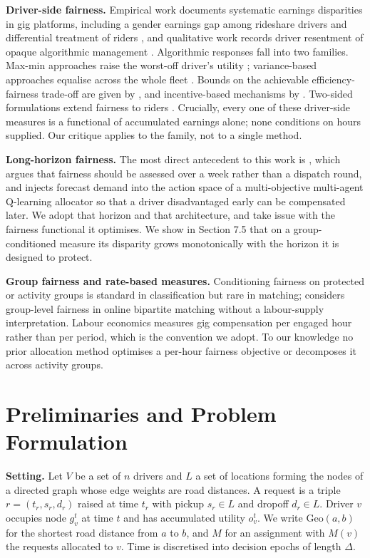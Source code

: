 \documentclass[10pt,twocolumn]{article}
\begin{document}
\textbf{Driver-side fairness.} Empirical work documents systematic earnings disparities in gig platforms, including a gender earnings gap among rideshare drivers \cite{cook2021} and differential treatment of riders \cite{brown2018}, and qualitative work records driver resentment of opaque algorithmic management \cite{mohlmann2019}. Algorithmic responses fall into two families. Max-min approaches raise the worst-off driver's utility \cite{lesmana2019}; variance-based approaches equalise across the whole fleet \cite{raman2021,shi2021,kang2024}. Bounds on the achievable efficiency-fairness trade-off are given by \cite{nanda2020,ma2020}, and incentive-based mechanisms by \cite{kumar2023}. Two-sided formulations extend fairness to riders \cite{suhr2019,kang2024b}. Crucially, every one of these driver-side measures is a functional of accumulated earnings alone; none conditions on hours supplied. Our critique applies to the family, not to a single method.

\textbf{Long-horizon fairness.} The most direct antecedent to this work is \cite{kang2024}, which argues that fairness should be assessed over a week rather than a dispatch round, and injects forecast demand into the action space of a multi-objective multi-agent Q-learning allocator so that a driver disadvantaged early can be compensated later. We adopt that horizon and that architecture, and take issue with the fairness functional it optimises. We show in Section 7.5 that on a group-conditioned measure its disparity grows monotonically with the horizon it is designed to protect.

\textbf{Group fairness and rate-based measures.} Conditioning fairness on protected or activity groups is standard in classification but rare in matching; \cite{ma2020} considers group-level fairness in online bipartite matching without a labour-supply interpretation. Labour economics measures gig compensation per engaged hour rather than per period, which is the convention we adopt. To our knowledge no prior allocation method optimises a per-hour fairness objective or decomposes it across activity groups.

\section{Preliminaries and Problem Formulation}
\textbf{Setting.} Let \(V\) be a set of \(n\) drivers and \(L\) a set of locations forming the nodes of a directed graph whose edge weights are road distances. A request is a triple \(r=(t_r,s_r,d_r)\) raised at time \(t_r\) with pickup \(s_r \in L\) and dropoff \(d_r \in L\). Driver \(v\) occupies node \(g_v^t\) at time \(t\) and has accumulated utility \(o_v^t\). We write \(\mathrm{Geo}(a,b)\) for the shortest road distance from \(a\) to \(b\), and \(M\) for an assignment with \(M(v)\) the requests allocated to \(v\). Time is discretised into decision epochs of length \(\Delta\).
\end{document}
